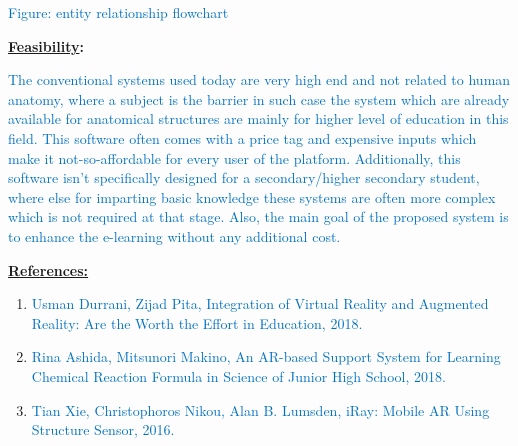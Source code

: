 \documentclass[12pt]{article}
\begin{document}
\begin{Center}
\textcolor[HTML]{0070C0}{Figure: entity relationship flowchart}
\end{Center}\par

{\fontsize{14pt}{16.8pt}\selectfont \textbf{\uline{Feasibility}: }\par}\par

\textcolor[HTML]{0070C0}{The conventional systems used today are very high end and not related to human anatomy, where a subject is the barrier in such case the system which are already available for anatomical structures are mainly for higher level of education in this field. This software often comes with a price tag and expensive inputs which make it not-so-affordable for every user of the platform. Additionally, this software isn’t specifically designed for a secondary/higher secondary student, where else for imparting basic knowledge these systems are often more complex which is not required at that stage. Also, the main goal of the proposed system is to enhance the e-learning without any additional cost.}\par

{\fontsize{14pt}{16.8pt}\selectfont \textbf{\uline{References:}}\par}\par


\vspace{\baselineskip}
\begin{enumerate}
	\item \textcolor[HTML]{0070C0}{Usman Durrani, Zijad Pita, Integration of Virtual Reality and Augmented Reality: Are the Worth the Effort in Education, 2018.}\par


\vspace{\baselineskip}
	\item \textcolor[HTML]{0070C0}{Rina Ashida, Mitsunori Makino, An AR-based Support System for Learning Chemical Reaction Formula in Science of Junior High School, 2018.}\par


\vspace{\baselineskip}
	\item \textcolor[HTML]{0070C0}{Tian Xie, Christophoros Nikou, Alan B. Lumsden, iRay: Mobile AR Using Structure Sensor, 2016.}
\end{enumerate}\par


\printbibliography
\end{document}
